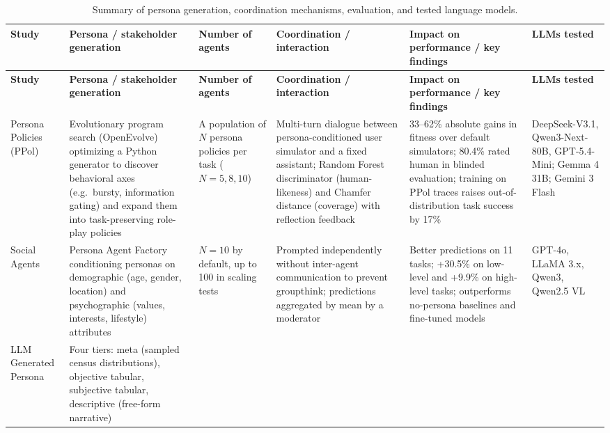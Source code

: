 \begin{appendices}
\begin{landscape}
\scriptsize
\setlength{\tabcolsep}{3pt}
\renewcommand{\arraystretch}{1.1}
\begin{longtable}{|p{2.2cm}|p{4.2cm}|p{2.8cm}|p{4.0cm}|p{5.0cm}|p{3.6cm}|}
    \caption{Summary of persona generation, coordination mechanisms, evaluation, and tested language models.}
    \label{tab:apx-persona-studies} \\
    \hline
    \textbf{Study} & \textbf{Persona / stakeholder generation} & \textbf{Number of agents} & \textbf{Coordination / interaction} & \textbf{Impact on performance / key findings} & \textbf{LLMs tested} \\
    \hline
    \endfirsthead
    \hline
    \textbf{Study} & \textbf{Persona / stakeholder generation} & \textbf{Number of agents} & \textbf{Coordination / interaction} & \textbf{Impact on performance / key findings} & \textbf{LLMs tested} \\
    \hline
    \endhead
    Persona Policies (PPol)~\cite{chopra2026beyond} &
    Evolutionary program search (OpenEvolve) optimizing a Python generator to discover behavioral axes (e.g.\ bursty, information gating) and expand them into task-preserving role-play policies &
    A population of $N$ persona policies per task ($N = 5, 8, 10$) &
    Multi-turn dialogue between persona-conditioned user simulator and a fixed assistant; Random Forest discriminator (human-likeness) and Chamfer distance (coverage) with reflection feedback &
    33--62\% absolute gains in fitness over default simulators; 80.4\% rated human in blinded evaluation; training on PPol traces raises out-of-distribution task success by 17\% &
    DeepSeek-V3.1, Qwen3-Next-80B, GPT-5.4-Mini; Gemma 4 31B; Gemini 3 Flash \\
    \hline
    Social Agents~\cite{bhattacharyya2026social} &
    Persona Agent Factory conditioning personas on demographic (age, gender, location) and psychographic (values, interests, lifestyle) attributes &
    $N = 10$ by default, up to 100 in scaling tests &
    Prompted independently without inter-agent communication to prevent groupthink; predictions aggregated by mean by a moderator &
    Better predictions on 11 tasks; +30.5\% on low-level and +9.9\% on high-level tasks; outperforms no-persona baselines and fine-tuned models &
    GPT-4o, LLaMA 3.x, Qwen3, Qwen2.5 VL \\
    \hline
    LLM Generated Persona~\cite{li2026persona} &
    Four tiers: meta (sampled census distributions), objective tabular, subjective tabular, descriptive (free-form narrative) &

\end{longtable}
\end{landscape}
\end{appendices}
